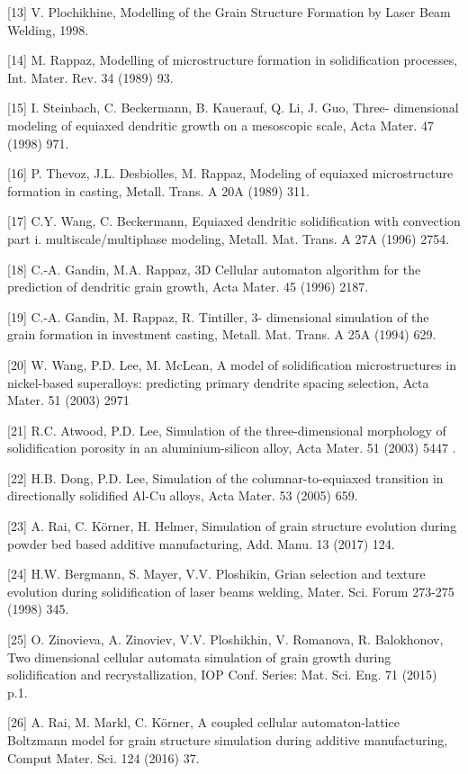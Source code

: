 \documentclass[10pt]{article}
\begin{document}
[13] V. Plochikhine, Modelling of the Grain Structure Formation by Laser Beam Welding, 1998.

[14] M. Rappaz, Modelling of microstructure formation in solidification processes, Int. Mater. Rev. 34 (1989) 93.

[15] I. Steinbach, C. Beckermann, B. Kauerauf, Q. Li, J. Guo, Three- dimensional modeling of equiaxed dendritic growth on a mesoscopic scale, Acta Mater. 47 (1998) 971.

[16] P. Thevoz, J.L. Desbiolles, M. Rappaz, Modeling of equiaxed microstructure formation in casting, Metall. Trans. A 20A (1989) 311.

[17] C.Y. Wang, C. Beckermann, Equiaxed dendritic solidification with convection part i. multiscale/multiphase modeling, Metall. Mat. Trans. A 27A (1996) 2754.

[18] C.-A. Gandin, M.A. Rappaz, 3D Cellular automaton algorithm for the prediction of dendritic grain growth, Acta Mater. 45 (1996) 2187.

[19] C.-A. Gandin, M. Rappaz, R. Tintiller, 3- dimensional simulation of the grain formation in investment casting, Metall. Mat. Trans. A 25A (1994) 629.

[20] W. Wang, P.D. Lee, M. McLean, A model of solidification microstructures in nickel-based superalloys: predicting primary dendrite spacing selection, Acta Mater. 51 (2003) 2971

[21] R.C. Atwood, P.D. Lee, Simulation of the three-dimensional morphology of solidification porosity in an aluminium-silicon alloy, Acta Mater. 51 (2003) 5447 .

[22] H.B. Dong, P.D. Lee, Simulation of the columnar-to-equiaxed transition in directionally solidified Al-Cu alloys, Acta Mater. 53 (2005) 659.

[23] A. Rai, C. Körner, H. Helmer, Simulation of grain structure evolution during powder bed based additive manufacturing, Add. Manu. 13 (2017) 124.

[24] H.W. Bergmann, S. Mayer, V.V. Ploshikin, Grian selection and texture evolution during solidification of laser beams welding, Mater. Sci. Forum 273-275 (1998) 345.

[25] O. Zinovieva, A. Zinoviev, V.V. Ploshikhin, V. Romanova, R. Balokhonov, Two dimensional cellular automata simulation of grain growth during solidification and recrystallization, IOP Conf. Series: Mat. Sci. Eng. 71 (2015) p.1.

[26] A. Rai, M. Markl, C. Körner, A coupled cellular automaton-lattice Boltzmann model for grain structure simulation during additive manufacturing, Comput Mater. Sci. 124 (2016) 37.
\end{document}
